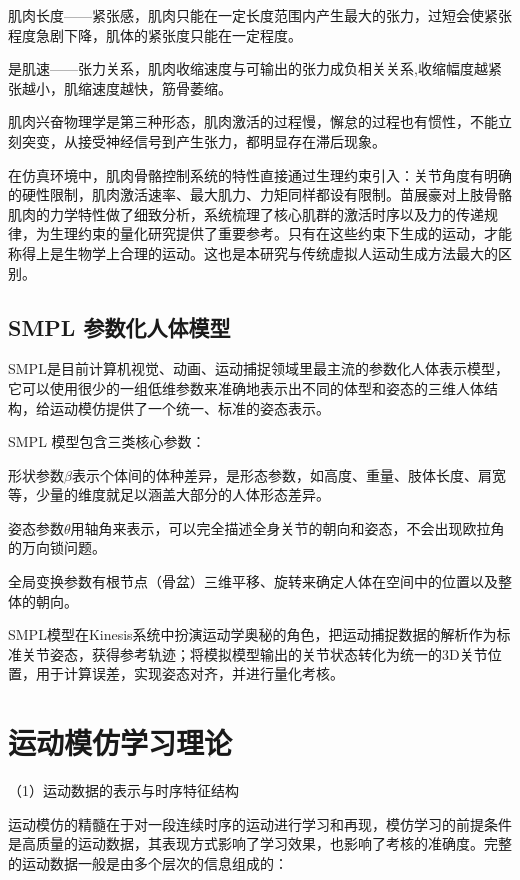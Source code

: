 肌肉长度——紧张感，肌肉只能在一定长度范围内产生最大的张力，过短会使紧张程度急剧下降，肌体的紧张度只能在一定程度。

是肌速——张力关系，肌肉收缩速度与可输出的张力成负相关关系,收缩幅度越紧张越小，肌缩速度越快，筋骨萎缩。

肌肉兴奋物理学是第三种形态，肌肉激活的过程慢，懈怠的过程也有惯性，不能立刻突变，从接受神经信号到产生张力，都明显存在滞后现象。

在仿真环境中，肌肉骨骼控制系统的特性直接通过生理约束引入：关节角度有明确的硬性限制，肌肉激活速率、最大肌力、力矩同样都设有限制。苗展豪\cite{ref27}对上肢骨骼肌肉的力学特性做了细致分析，系统梳理了核心肌群的激活时序以及力的传递规律，为生理约束的量化研究提供了重要参考。只有在这些约束下生成的运动，才能称得上是生物学上合理的运动。这也是本研究与传统虚拟人运动生成方法最大的区别。

\subsection{SMPL 参数化人体模型}\label{smpl-ux53c2ux6570ux5316ux4ebaux4f53ux6a21ux578b}

SMPL是目前计算机视觉、动画、运动捕捉领域里最主流的参数化人体表示模型，它可以使用很少的一组低维参数来准确地表示出不同的体型和姿态的三维人体结构，给运动模仿提供了一个统一、标准的姿态表示。

SMPL 模型包含三类核心参数：

形状参数$\beta$表示个体间的体种差异，是形态参数，如高度、重量、肢体长度、肩宽等，少量的维度就足以涵盖大部分的人体形态差异。

姿态参数$\theta$用轴角来表示，可以完全描述全身关节的朝向和姿态，不会出现欧拉角的万向锁问题。

全局变换参数有根节点（骨盆）三维平移、旋转来确定人体在空间中的位置以及整体的朝向。

SMPL模型在Kinesis系统中扮演运动学奥秘的角色，把运动捕捉数据的解析作为标准关节姿态，获得参考轨迹；将模拟模型输出的关节状态转化为统一的3D关节位置，用于计算误差，实现姿态对齐，并进行量化考核。

\section{运动模仿学习理论}\label{ux8fd0ux52a8ux6a21ux4effux5b66ux4e60ux7406ux8bba}

（1）运动数据的表示与时序特征结构

运动模仿的精髓在于对一段连续时序的运动进行学习和再现，模仿学习的前提条件是高质量的运动数据，其表现方式影响了学习效果，也影响了考核的准确度。完整的运动数据一般是由多个层次的信息组成的：

